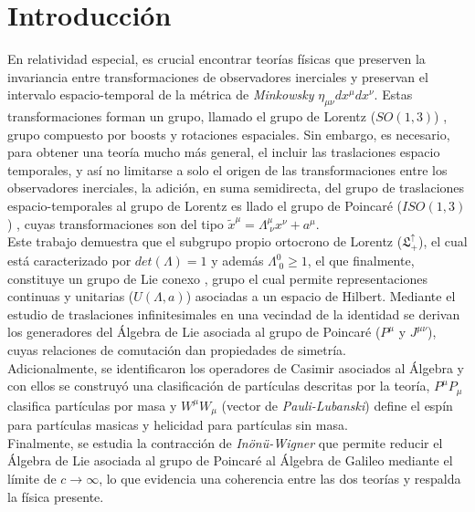 \documentclass[12pt,letterpaper]{article}
\begin{document}
\section{Introducción}
En relatividad especial, es crucial encontrar teorías físicas que preserven la invariancia entre transformaciones de observadores inerciales \cite{r-especial} y preservan el intervalo espacio-temporal de la métrica de \emph{Minkowsky} \cite{apunte} $\eta_{\mu\nu}dx^\mu dx^\nu$. Estas transformaciones forman un grupo, llamado el grupo de Lorentz ($SO(1,3)$) \cite{apunte}, grupo compuesto por boosts y rotaciones espaciales. Sin embargo, es necesario, para obtener una teoría mucho más general, el incluir las traslaciones espacio temporales, y así no limitarse a solo el origen de las transformaciones entre los observadores inerciales, la adición, en suma semidirecta, del grupo de traslaciones espacio-temporales al grupo de Lorentz es llado el grupo de Poincaré ($ISO(1,3)$) \cite{weinberg-v1}, cuyas transformaciones son del tipo $\tilde{x}^\mu = \Lambda^\mu_{\;\nu}x^\nu + a^\mu$. \\
Este trabajo demuestra que el subgrupo propio ortocrono de Lorentz ($\mathfrak{L}^\uparrow_+$), el cual está caracterizado por $det(\Lambda)=1$ y además $\Lambda^0_{\;0}\geq 1$, el que finalmente, constituye un grupo de Lie conexo \cite{apunte}, grupo el cual permite representaciones continuas y unitarias ($U(\Lambda,a)$) asociadas a un espacio de Hilbert. Mediante el estudio de traslaciones infinitesimales en una vecindad de la identidad se derivan los generadores del Álgebra de Lie asociada al grupo de Poincaré ($P^\mu$ y $J^{\mu\nu}$), cuyas relaciones de comutación dan propiedades de simetría. \\
 Adicionalmente, se identificaron los operadores de Casimir asociados al Álgebra y con ellos se construyó una clasificación de partículas descritas por la teoría, $P^\mu P_\mu$ clasifica partículas por masa y $W^\mu W_\mu$ (vector de \emph{Pauli-Lubanski}) define el espín para partículas masicas y helicidad para partículas sin masa. \\
Finalmente, se estudia la contracción de \emph{Inönü-Wigner} que permite reducir el Álgebra de Lie asociada al grupo de Poincaré al Álgebra de Galileo mediante el límite de $c\to\infty$, lo que evidencia una coherencia entre las dos teorías y respalda la física presente.
\end{document}
